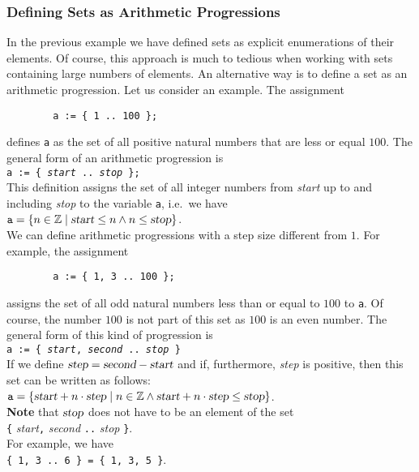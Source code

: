 \subsubsection{Defining Sets as Arithmetic Progressions}
In the previous example we have defined sets as explicit enumerations of their elements.  Of course,
this approach is much to tedious when working with sets containing large numbers of elements.  An
alternative way is to define a set as an arithmetic progression.  Let us consider an example.  The assignment
\begin{verbatim}
        a := { 1 .. 100 };
\end{verbatim}
defines \texttt{a} as the set of all positive natural numbers that are less or equal $100$.
The general form of an arithmetic progression is
\\[0.2cm]
\hspace*{1.3cm} 
\texttt{a := \{ \textsl{start} .. \textsl{stop} \};} 
\\[0.2cm]
This definition assigns the set of all integer numbers from \textsl{start} up to and including
\textsl{stop} to the variable \texttt{a}, i.e.~we have
 \\[0.2cm]
\hspace*{1.3cm} 
$\texttt{a} = \{ n \in \mathbb{Z} \mid \textsl{start} \leq n \wedge n \leq\textsl{stop} \}$. 
\\[0.2cm]
We can define arithmetic progressions with a step size different from $1$.  For example,
the assignment
\begin{verbatim}
        a := { 1, 3 .. 100 };
\end{verbatim}
assigns the set of all odd natural numbers less than or equal to $100$ to \texttt{a}.
Of course, the number $100$ is not part of this set as $100$ is an even number.
The general form of this kind of progression is
\\[0.2cm]
\hspace*{1.3cm} 
\texttt{a := \{ \textsl{start}, \textsl{second} .. \textsl{stop} \}} 
\\[0.2cm]
If we define $\textsl{step} = \textsl{second} - \textsl{start}$ and if, furthermore,  \textsl{step}
is positive, then this set can be written as follows:
\\[0.2cm]
\hspace*{1.3cm} 
$\texttt{a} = \{ \textsl{start} + n \cdot \textsl{step} \mid n \in \mathbb{Z} \wedge \textsl{start} + n \cdot \textsl{step} \leq\textsl{stop} \}$. 
\\[0.2cm]
\textbf{Note} that  $\textsl{stop}$ does not have to be an element of the set
\\[0.2cm]
\hspace*{1.3cm}
\texttt{\{} \textsl{start}\texttt{,} \textsl{second} \texttt{..} \textsl{stop} \texttt{\}}.
\\[0.2cm]
For example, we have
\\[0.2cm]
\hspace*{1.3cm}
\texttt{\{ 1, 3 .. 6 \} = \{ 1, 3, 5 \}}.


